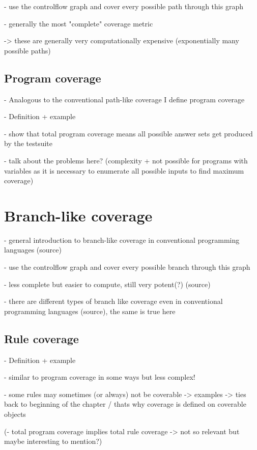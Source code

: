     - use the controlflow graph and cover every possible path through this graph

- generally the most "complete" coverage metric

-> these are generally very computationally expensive (exponentially many possible paths)

\subsection{Program coverage}
\label{subsec:Coverage metrics/Path-like coverage/Program coverage}
- Analogous to the conventional path-like coverage I define program coverage

- Definition + example

- show that total program coverage means all possible answer sets get produced by the testsuite

- talk about the problems here? (complexity + not possible for programs with variables as it is necessary to enumerate all 
possible inputs to find maximum coverage)

\section{Branch-like coverage}
\label{sec:Coverage metrics/Branch-like coverage}
- general introduction to branch-like coverage in conventional programming languages (source)

    - use the controlflow graph and cover every possible branch through this graph

- less complete but easier to compute, still very potent(?) (source)

- there are different types of branch like coverage even in conventional programming languages (source), the same is true here

\subsection{Rule coverage}
\label{subsec:Coverage metrics/Branch-like coverage/Rule coverage}
- Definition + example

- similar to program coverage in some ways but less complex!

- some rules may sometimes (or always) not be coverable -> examples -> ties back to beginning of the chapter / thats why coverage 
is defined on coverable objects

(- total program coverage implies total rule coverage -> not so relevant but maybe interesting to mention?)

